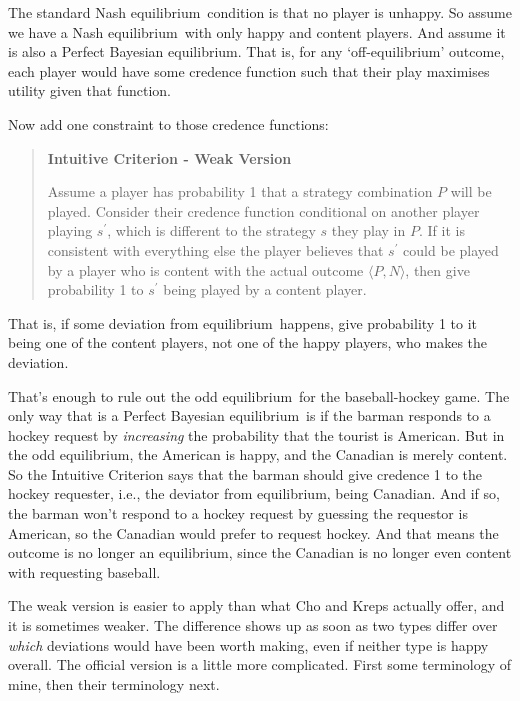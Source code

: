 \documentclass[
  11pt,
  letterpaper,
]{scrbook}
\begin{document}
The standard Nash equilibrium~condition is that no player is unhappy. So
assume we have a Nash equilibrium  with only happy and content players.
And assume it is also a Perfect Bayesian equilibrium. That is, for any
`off-equilibrium' outcome, each player would have some credence function
such that their play maximises utility given that function.

Now add one constraint to those credence functions:

\begin{quote}
\textbf{Intuitive Criterion - Weak Version}

Assume a player has probability 1 that a strategy combination \(P\) will
be played. Consider their credence function conditional on another
player playing \(s^\prime\), wh\-ich is different to the strategy \(s\)
they play in \(P\). If it is consistent with everything else the player
believes that \(s^\prime\) could be played by a player who is content
with the actual outcome \(\langle P, N \rangle\), then give probability
1 to \(s^\prime\) being played by a content player.
\end{quote}

That is, if some deviation from equilibrium~happens, give probability 1
to it being one of the content players, not one of the happy players,
who makes the deviation.

That's enough to rule out the odd equilibrium~for the baseball-hockey
game. The only way that is a Perfect Bayesian equilibrium~is if the
barman responds to a hockey request by \emph{increasing} the probability
that the tourist is American. But in the odd equilibrium, the American
is happy, and the Canadian is merely content. So the Intuitive Criterion
says that the barman should give credence 1 to the hockey requester,
i.e., the deviator from equilibrium, being Canadian. And if so, the
barman won't respond to a hockey request by guessing the requestor is
American, so the Canadian would prefer to request hockey. And that means
the outcome is no longer an equilibrium, since the Canadian is no longer
even content with requesting baseball.

The weak version is easier to apply than what Cho and Kreps actually
offer, and it is sometimes weaker. The difference shows up as soon as
two types differ over \emph{which} deviations would have been worth
making, even if neither type is happy overall. The official version is a
little more complicated. First some terminology of mine, then their
terminology next.
\end{document}
